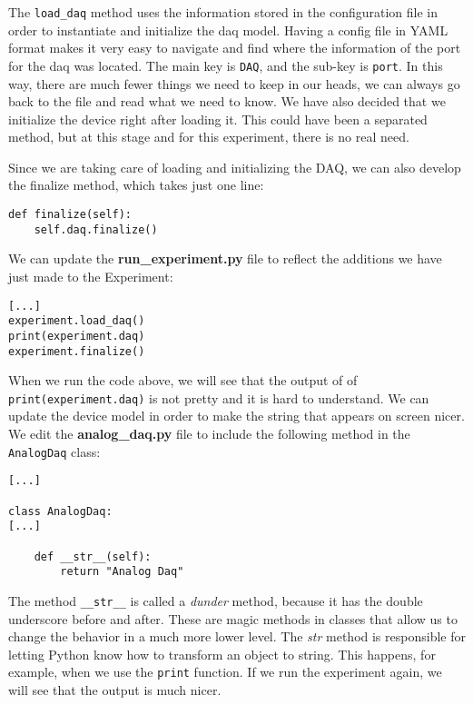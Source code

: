 The \texttt{load\_daq} method uses the information stored in the configuration file in order to instantiate and initialize the daq model. Having a config file in YAML format makes it very easy to navigate and find where the information of the port for the daq was located. The main key is \texttt{DAQ}, and the sub-key is \texttt{port}. In this way, there are much fewer things we need to keep in our heads, we can always go back to the file and read what we need to know. We have also decided that we initialize the device right after loading it. This could have been a separated method, but at this stage and for this experiment, there is no real need.

Since we are taking care of loading and initializing the DAQ, we can also develop the finalize method, which takes just one line:

\begin{verbatim}
def finalize(self):
    self.daq.finalize()
\end{verbatim}

We can update the \textbf{run\_experiment.py} file to reflect the additions we have just made to the Experiment:

\begin{verbatim}
[...]
experiment.load_daq()
print(experiment.daq)
experiment.finalize()
\end{verbatim}

When we run the code above, we will see that the output of of \texttt{print(experiment.daq)} is not pretty and it is hard to understand. We can update the device model in order to make the string that appears on screen nicer. We edit the \textbf{analog\_daq.py} file to include the following method in the \texttt{AnalogDaq} class:

\begin{verbatim}
[...]

class AnalogDaq:
[...]

    def __str__(self):
        return "Analog Daq"
\end{verbatim}

The method \texttt{\_\_str\_\_} is called a \emph{dunder} method, because it has the double underscore before and after. These are magic methods in classes that allow us to change the behavior in a much more lower level. The \emph{str} method is responsible for letting Python know how to transform an object to string. This happens, for example, when we use the \texttt{print} function. If we run the experiment again, we will see that the output is much nicer.

